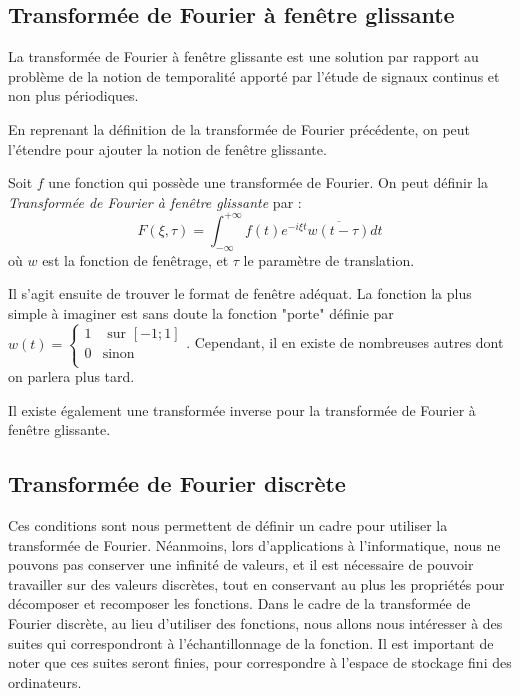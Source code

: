 	\subsection{Transformée de Fourier à fenêtre glissante}
	La transformée de Fourier à fenêtre glissante est une solution par rapport au problème de la notion de temporalité apporté par l'étude de signaux continus et non plus périodiques. 

	En reprenant la définition de la transformée de Fourier précédente, on peut l'étendre pour ajouter la notion de fenêtre glissante. 
		
	\begin{mydef}
		Soit $f$ une fonction qui possède une transformée de Fourier. On peut définir la \textit{Transformée de Fourier à fenêtre glissante} par :
		$$ F(\xi, \tau)= \int_{-\infty}^{+\infty}f(t)e^{-i \xi t} \overline{w(t - \tau)}dt$$
		où $w$ est la fonction de fenêtrage, et $\tau$ le paramètre de translation. 
	\end{mydef}
	Il s'agit ensuite de trouver le format de fenêtre adéquat. La fonction la plus simple à imaginer est sans doute la fonction "porte" définie par 
	$w(t) = \left\{
		\begin{array}{cc}
		1 & \text{ sur }[-1; 1] \\
		0 & \text{sinon} \\
		\end{array}
	\right. $.
	Cependant, il en existe de nombreuses autres dont on parlera plus tard. 
	
	\begin{myrem}
		Il existe également une transformée inverse pour la transformée de Fourier à fenêtre glissante. 
	\end{myrem}
	
	\subsection{Transformée de Fourier discrète}
			
	Ces conditions sont nous permettent de définir un cadre pour utiliser la transformée de Fourier. Néanmoins, lors d'applications à l'informatique, nous ne pouvons pas conserver une infinité de valeurs, et il est nécessaire de pouvoir travailler sur des valeurs discrètes, tout en conservant au plus les propriétés pour décomposer et recomposer les fonctions. 		
	Dans le cadre de la transformée de Fourier discrète, au lieu d'utiliser des fonctions, nous allons nous intéresser à des suites qui correspondront à l'échantillonnage de la fonction. Il est important de noter que ces suites seront finies, pour correspondre à l'espace de stockage fini des ordinateurs. 
	

